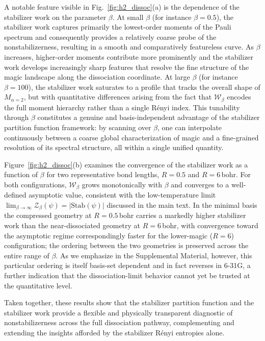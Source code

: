 \documentclass[aps,pra,superscriptaddress,twocolumn,longbibliography]{revtex4-2}
\newcommand{\figref}[1]{Fig.~\ref{#1}}
\begin{document}
A notable feature visible in \figref{fig:h2_dissoc}(a) is the dependence of the stabilizer work on the parameter $\beta$. At small $\beta$ (for instance $\beta=0.5$), the stabilizer work captures primarily the lowest-order moments of the Pauli spectrum and consequently provides a relatively coarse probe of the nonstabilizerness, resulting in a smooth and comparatively featureless curve. As $\beta$ increases, higher-order moments contribute more prominently and the stabilizer work develops increasingly sharp features that resolve the fine structure of the magic landscape along the dissociation coordinate. At large $\beta$ (for instance $\beta=100$), the stabilizer work saturates to a profile that tracks the overall shape of $M_{\alpha=2}$, but with quantitative differences arising from the fact that $\mathcal{W}_{\beta}$ encodes the full moment hierarchy rather than a single R\'{e}nyi index. This tunability through $\beta$ constitutes a genuine and basis-independent advantage of the stabilizer partition function framework: by scanning over $\beta$, one can interpolate continuously between a coarse global characterization of magic and a fine-grained resolution of its spectral structure, all within a single unified quantity.

Figure~\ref{fig:h2_dissoc}(b) examines the convergence of the stabilizer work as a function of $\beta$ for two representative bond lengths, $R=0.5$ and $R=6$\,bohr. For both configurations, $\mathcal{W}_{\beta}$ grows monotonically with $\beta$ and converges to a well-defined asymptotic value, consistent with the low-temperature limit $\lim_{\beta\to\infty}\mathcal{Z}_{\beta}(\psi)=|\mathrm{Stab}(\psi)|$ discussed in the main text. In the minimal basis the compressed geometry at $R=0.5$\,bohr carries a markedly higher stabilizer work than the near-dissociated geometry at $R=6$\,bohr, with convergence toward the asymptotic regime correspondingly faster for the lower-magic ($R=6$) configuration; the ordering between the two geometries is preserved across the entire range of $\beta$. As we emphasize in the Supplemental Material, however, this particular ordering is itself basis-set dependent and in fact reverses in 6-31G, a further indication that the dissociation-limit behavior cannot yet be trusted at the quantitative level.

Taken together, these results show that the stabilizer partition function and the stabilizer work provide a flexible and physically transparent diagnostic of nonstabilizerness across the full dissociation pathway, complementing and extending the insights afforded by the stabilizer R\'{e}nyi entropies alone. 
\end{document}
